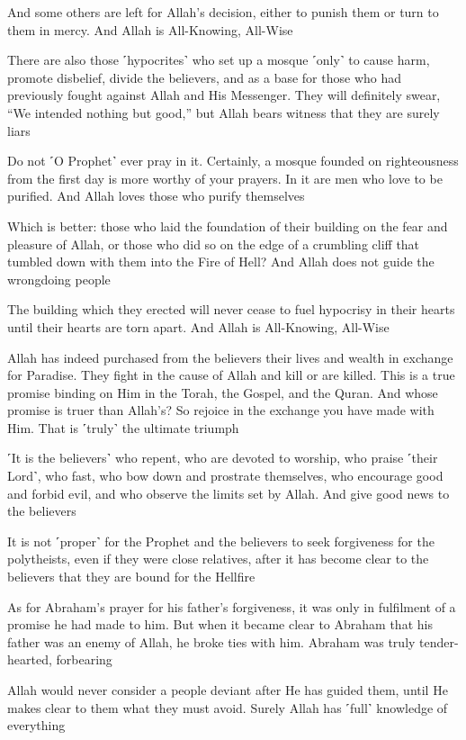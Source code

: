 And some others are left for Allah’s decision, either to punish them or turn to them in mercy. And Allah is All-Knowing, All-Wise

There are also those ˹hypocrites˺ who set up a mosque ˹only˺ to cause harm, promote disbelief, divide the believers, and as a base for those who had previously fought against Allah and His Messenger. They will definitely swear, “We intended nothing but good,” but Allah bears witness that they are surely liars

Do not ˹O Prophet˺ ever pray in it. Certainly, a mosque founded on righteousness from the first day is more worthy of your prayers. In it are men who love to be purified. And Allah loves those who purify themselves

Which is better: those who laid the foundation of their building on the fear and pleasure of Allah, or those who did so on the edge of a crumbling cliff that tumbled down with them into the Fire of Hell? And Allah does not guide the wrongdoing people

The building which they erected will never cease to fuel hypocrisy in their hearts until their hearts are torn apart. And Allah is All-Knowing, All-Wise

Allah has indeed purchased from the believers their lives and wealth in exchange for Paradise. They fight in the cause of Allah and kill or are killed. This is a true promise binding on Him in the Torah, the Gospel, and the Quran. And whose promise is truer than Allah’s? So rejoice in the exchange you have made with Him. That is ˹truly˺ the ultimate triumph

˹It is the believers˺ who repent, who are devoted to worship, who praise ˹their Lord˺, who fast, who bow down and prostrate themselves, who encourage good and forbid evil, and who observe the limits set by Allah. And give good news to the believers

It is not ˹proper˺ for the Prophet and the believers to seek forgiveness for the polytheists, even if they were close relatives, after it has become clear to the believers that they are bound for the Hellfire

As for Abraham’s prayer for his father’s forgiveness, it was only in fulfilment of a promise he had made to him. But when it became clear to Abraham that his father was an enemy of Allah, he broke ties with him. Abraham was truly tender-hearted, forbearing

Allah would never consider a people deviant after He has guided them, until He makes clear to them what they must avoid. Surely Allah has ˹full˺ knowledge of everything

